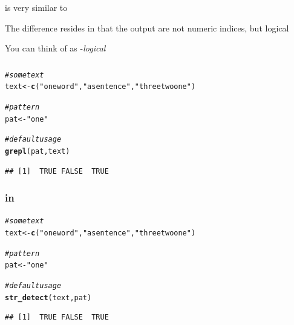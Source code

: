 \documentclass[12pt]{beamer}\usepackage[]{graphicx}\usepackage[]{color}
\makeatletter
\newcommand{\hlstr}[1]{\textcolor[rgb]{0.192,0.494,0.8}{#1}}%
\newcommand{\hlcom}[1]{\textcolor[rgb]{0.678,0.584,0.686}{\textit{#1}}}%
\newcommand{\hlstd}[1]{\textcolor[rgb]{0.345,0.345,0.345}{#1}}%
\newcommand{\hlkwb}[1]{\textcolor[rgb]{0.69,0.353,0.396}{#1}}%
\newcommand{\hlkwd}[1]{\textcolor[rgb]{0.737,0.353,0.396}{\textbf{#1}}}%
\newenvironment{kframe}{%
 \def\at@end@of@kframe{}%
 \ifinner\ifhmode%
  \def\at@end@of@kframe{\end{minipage}}%
  \begin{minipage}{\columnwidth}%
 \fi\fi%
 \def\FrameCommand##1{\hskip\@totalleftmargin \hskip-\fboxsep
 \colorbox{shadecolor}{##1}\hskip-\fboxsep
     \hskip-\linewidth \hskip-\@totalleftmargin \hskip\columnwidth}%
 \MakeFramed {\advance\hsize-\width
   \@totalleftmargin\z@ \linewidth\hsize
   \@setminipage}}%
 {\par\unskip\endMakeFramed%
 \at@end@of@kframe}
\newenvironment{knitrout}{}{} %
\makeatother
\begin{document}

\begin{frame}[fragile]
\frametitle{}

\bbi
  \item {} is very similar to 
  \item The difference resides in that the output are not numeric indices, but logical
  \item You can think of  as -\textit{logical}
\ei

\end{frame}


\begin{frame}[fragile]
\frametitle{}

\begin{knitrout}\footnotesize
{}\color{fgcolor}\begin{kframe}
\begin{alltt}
\hlcom{# some text}
\hlstd{text} \hlkwb{<-} \hlkwd{c}\hlstd{(}\hlstr{"one word"}\hlstd{,} \hlstr{"a sentence"}\hlstd{,} \hlstr{"three two one"}\hlstd{)}

\hlcom{# pattern}
\hlstd{pat} \hlkwb{<-} \hlstr{"one"}

\hlcom{# default usage}
\hlkwd{grepl}\hlstd{(pat, text)}
\end{alltt}
\begin{verbatim}
## [1]  TRUE FALSE  TRUE
\end{verbatim}
\end{kframe}
\end{knitrout}

\end{frame}


\begin{frame}[fragile]
\frametitle{ in }

\begin{knitrout}\footnotesize
{}\color{fgcolor}\begin{kframe}
\begin{alltt}
\hlcom{# some text}
\hlstd{text} \hlkwb{<-} \hlkwd{c}\hlstd{(}\hlstr{"one word"}\hlstd{,} \hlstr{"a sentence"}\hlstd{,} \hlstr{"three two one"}\hlstd{)}

\hlcom{# pattern}
\hlstd{pat} \hlkwb{<-} \hlstr{"one"}

\hlcom{# default usage}
\hlkwd{str_detect}\hlstd{(text, pat)}
\end{alltt}
\begin{verbatim}
## [1]  TRUE FALSE  TRUE
\end{verbatim}
\end{kframe}
\end{knitrout}

\end{frame}
\end{document}
